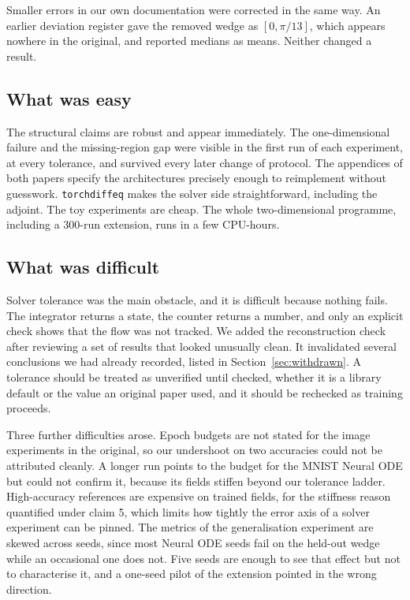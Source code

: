 Smaller errors in our own documentation were corrected in the same way. An earlier deviation
register gave the removed wedge as $[0,\pi/13]$, which appears nowhere in the original, and
reported medians as means. Neither changed a result.

\subsection{What was easy}

The structural claims are robust and appear immediately. The one-dimensional failure and the
missing-region gap were visible in the first run of each experiment, at every tolerance, and
survived every later change of protocol. The appendices of both papers specify the
architectures precisely enough to reimplement without guesswork. \texttt{torchdiffeq} makes the
solver side straightforward, including the adjoint. The toy experiments are cheap. The whole
two-dimensional programme, including a 300-run extension, runs in a few CPU-hours.

\subsection{What was difficult}

Solver tolerance was the main obstacle, and it is difficult because nothing fails. The
integrator returns a state, the counter returns a number, and only an explicit check shows that
the flow was not tracked. We added the reconstruction check after reviewing a set of results
that looked unusually clean. It invalidated several conclusions we had already recorded, listed in
Section~\ref{sec:withdrawn}. A tolerance should be treated
as unverified until checked, whether it is a library default or the value an original paper
used, and it should be rechecked as training proceeds.

Three further difficulties arose. Epoch budgets are not stated for the image
experiments in the original, so our undershoot on two accuracies could not be attributed cleanly. A longer run points to the
budget for the MNIST Neural ODE but could not confirm it, because its fields stiffen beyond our
tolerance ladder.
High-accuracy references are expensive on trained fields, for the stiffness reason quantified
under claim 5, which limits how tightly the error axis of a solver experiment can be pinned.
The metrics of the generalisation experiment are skewed across seeds, since most Neural ODE
seeds fail on the held-out wedge while an occasional one does not. Five seeds are enough to see
that effect but not to characterise it, and a one-seed pilot of the extension pointed in the
wrong direction.

